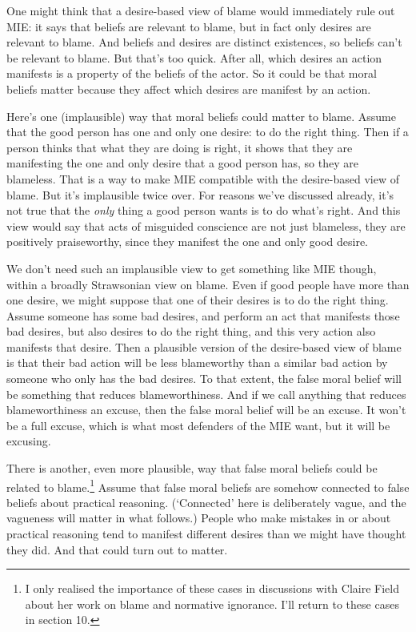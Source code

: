 \documentclass[
  10pt,
  letterpaper,
  twoside]{scrbook}
\begin{document}
One might think that a desire-based view of blame would immediately rule
out MIE: it says that beliefs are relevant to blame, but in fact only
desires are relevant to blame. And beliefs and desires are distinct
existences, so beliefs can't be relevant to blame. But that's too quick.
After all, which desires an action manifests is a property of the
beliefs of the actor. So it could be that moral beliefs matter because
they affect which desires are manifest by an action.

Here's one (implausible) way that moral beliefs could matter to blame.
Assume that the good person has one and only one desire: to do the right
thing. Then if a person thinks that what they are doing is right, it
shows that they are manifesting the one and only desire that a good
person has, so they are blameless. That is a way to make MIE compatible
with the desire-based view of blame. But it's implausible twice over.
For reasons we've discussed already, it's not true that the \emph{only}
thing a good person wants is to do what's right. And this view would say
that acts of misguided conscience are not just blameless, they are
positively praiseworthy, since they manifest the one and only good
desire.

We don't need such an implausible view to get something like MIE though,
within a broadly Strawsonian view on blame. Even if good people have
more than one desire, we might suppose that one of their desires is to
do the right thing. Assume someone has some bad desires, and perform an
act that manifests those bad desires, but also desires to do the right
thing, and this very action also manifests that desire. Then a plausible
version of the desire-based view of blame is that their bad action will
be less blameworthy than a similar bad action by someone who only has
the bad desires. To that extent, the false moral belief will be
something that reduces blameworthiness. And if we call anything that
reduces blameworthiness an excuse, then the false moral belief will be
an excuse. It won't be a full excuse, which is what most defenders of
the MIE want, but it will be excusing.

There is another, even more plausible, way that false moral beliefs
could be related to blame.\footnote{I only realised the importance of
  these cases in discussions with Claire Field about her work on blame
  and normative ignorance. I'll return to these cases in section 10.}
Assume that false moral beliefs are somehow connected to false beliefs
about practical reasoning. (`Connected' here is deliberately vague, and
the vagueness will matter in what follows.) People who make mistakes in
or about practical reasoning tend to manifest different desires than we
might have thought they did. And that could turn out to matter.
\end{document}
